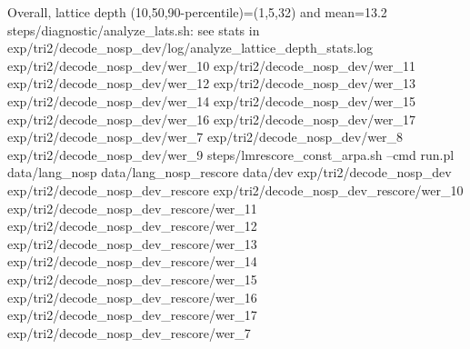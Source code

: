 Overall, lattice depth (10,50,90-percentile)=(1,5,32) and mean=13.2
steps/diagnostic/analyze_lats.sh: see stats in exp/tri2/decode_nosp_dev/log/analyze_lattice_depth_stats.log
exp/tri2/decode_nosp_dev/wer_10
exp/tri2/decode_nosp_dev/wer_11
exp/tri2/decode_nosp_dev/wer_12
exp/tri2/decode_nosp_dev/wer_13
exp/tri2/decode_nosp_dev/wer_14
exp/tri2/decode_nosp_dev/wer_15
exp/tri2/decode_nosp_dev/wer_16
exp/tri2/decode_nosp_dev/wer_17
exp/tri2/decode_nosp_dev/wer_7
exp/tri2/decode_nosp_dev/wer_8
exp/tri2/decode_nosp_dev/wer_9
steps/lmrescore_const_arpa.sh --cmd run.pl data/lang_nosp data/lang_nosp_rescore data/dev exp/tri2/decode_nosp_dev exp/tri2/decode_nosp_dev_rescore
exp/tri2/decode_nosp_dev_rescore/wer_10
exp/tri2/decode_nosp_dev_rescore/wer_11
exp/tri2/decode_nosp_dev_rescore/wer_12
exp/tri2/decode_nosp_dev_rescore/wer_13
exp/tri2/decode_nosp_dev_rescore/wer_14
exp/tri2/decode_nosp_dev_rescore/wer_15
exp/tri2/decode_nosp_dev_rescore/wer_16
exp/tri2/decode_nosp_dev_rescore/wer_17
exp/tri2/decode_nosp_dev_rescore/wer_7
